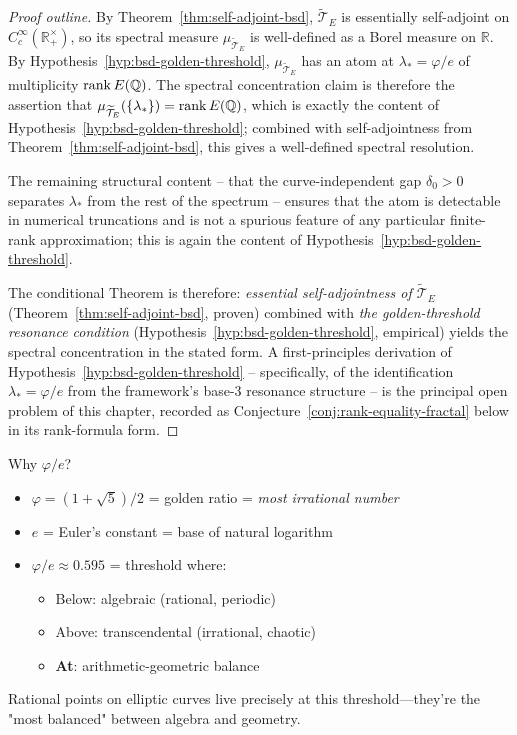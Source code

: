 \begin{proof}[Proof outline]
By Theorem~\ref{thm:self-adjoint-bsd}, $\widetilde{\mathcal{T}}_E$ is essentially self-adjoint on $C_c^\infty(\mathbb{R}_+^\times)$, so its spectral measure $\mu_{\widetilde{\mathcal{T}}_E}$ is well-defined as a Borel measure on $\mathbb{R}$. By Hypothesis~\ref{hyp:bsd-golden-threshold}, $\mu_{\widetilde{\mathcal{T}}_E}$ has an atom at $\lambda_* = \varphi/e$ of multiplicity $\rank E(\mathbb{Q})$. The spectral concentration claim is therefore the assertion that $\mu_{\widetilde{\mathcal{T}}_E}(\{\lambda_*\}) = \rank E(\mathbb{Q})$, which is exactly the content of Hypothesis~\ref{hyp:bsd-golden-threshold}; combined with self-adjointness from Theorem~\ref{thm:self-adjoint-bsd}, this gives a well-defined spectral resolution.

The remaining structural content -- that the curve-independent gap $\delta_0 > 0$ separates $\lambda_*$ from the rest of the spectrum -- ensures that the atom is detectable in numerical truncations and is not a spurious feature of any particular finite-rank approximation; this is again the content of Hypothesis~\ref{hyp:bsd-golden-threshold}.

The conditional Theorem is therefore: \emph{essential self-adjointness of $\widetilde{\mathcal{T}}_E$} (Theorem~\ref{thm:self-adjoint-bsd}, proven) combined with \emph{the golden-threshold resonance condition} (Hypothesis~\ref{hyp:bsd-golden-threshold}, empirical) yields the spectral concentration in the stated form. A first-principles derivation of Hypothesis~\ref{hyp:bsd-golden-threshold} -- specifically, of the identification $\lambda_* = \varphi/e$ from the framework's base-$3$ resonance structure -- is the principal open problem of this chapter, recorded as Conjecture~\ref{conj:rank-equality-fractal} below in its rank-formula form.
\end{proof}

\begin{keyidea}
Why $\varphi/e$?

\begin{itemize}
\item $\varphi = (1+\sqrt{5})/2$ = golden ratio = \textit{most irrational number}
\item $e$ = Euler's constant = base of natural logarithm
\item $\varphi/e \approx 0.595$ = threshold where:
  \begin{itemize}
  \item Below: algebraic (rational, periodic)
  \item Above: transcendental (irrational, chaotic)
  \item \textbf{At}: arithmetic-geometric balance
  \end{itemize}
\end{itemize}

Rational points on elliptic curves live precisely at this threshold—they're the "most balanced" between algebra and geometry.
\end{keyidea}

